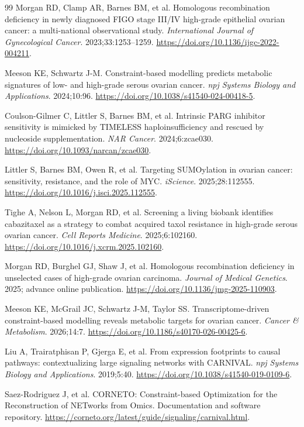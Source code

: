 \begin{thebibliography}{99}
Morgan RD, Clamp AR, Barnes BM, et al. Homologous recombination deficiency in
newly diagnosed FIGO stage III/IV high-grade epithelial ovarian cancer: a
multi-national observational study. \emph{International Journal of
Gynecological Cancer}. 2023;33:1253--1259.
\url{https://doi.org/10.1136/ijgc-2022-004211}.

Meeson KE, Schwartz J-M. Constraint-based modelling predicts metabolic
signatures of low- and high-grade serous ovarian cancer. \emph{npj Systems
Biology and Applications}. 2024;10:96.
\url{https://doi.org/10.1038/s41540-024-00418-5}.

Coulson-Gilmer C, Littler S, Barnes BM, et al. Intrinsic PARG inhibitor
sensitivity is mimicked by TIMELESS haploinsufficiency and rescued by
nucleoside supplementation.
\emph{NAR Cancer}. 2024;6:zcae030.
\url{https://doi.org/10.1093/narcan/zcae030}.

Littler S, Barnes BM, Owen R, et al. Targeting SUMOylation in ovarian cancer:
sensitivity, resistance, and the role of MYC. \emph{iScience}.
2025;28:112555. \url{https://doi.org/10.1016/j.isci.2025.112555}.

Tighe A, Nelson L, Morgan RD, et al. Screening a living biobank identifies
cabazitaxel as a strategy to combat acquired taxol resistance in high-grade
serous ovarian cancer. \emph{Cell Reports Medicine}. 2025;6:102160.
\url{https://doi.org/10.1016/j.xcrm.2025.102160}.

Morgan RD, Burghel GJ, Shaw J, et al. Homologous recombination deficiency in
unselected cases of high-grade ovarian carcinoma. \emph{Journal of Medical
Genetics}. 2025; advance online publication.
\url{https://doi.org/10.1136/jmg-2025-110903}.

Meeson KE, McGrail JC, Schwartz J-M, Taylor SS. Transcriptome-driven
constraint-based modelling reveals metabolic targets for ovarian cancer.
\emph{Cancer \& Metabolism}. 2026;14:7.
\url{https://doi.org/10.1186/s40170-026-00425-6}.

Liu A, Trairatphisan P, Gjerga E, et al. From expression footprints to causal
pathways: contextualizing large signaling networks with CARNIVAL.
\emph{npj Systems Biology and Applications}. 2019;5:40.
\url{https://doi.org/10.1038/s41540-019-0109-6}.

Saez-Rodriguez J, et al. CORNETO: Constraint-based Optimization for the
Reconstruction of NETworks from Omics. Documentation and software repository.
\url{https://corneto.org/latest/guide/signaling/carnival.html}.


\end{thebibliography}
